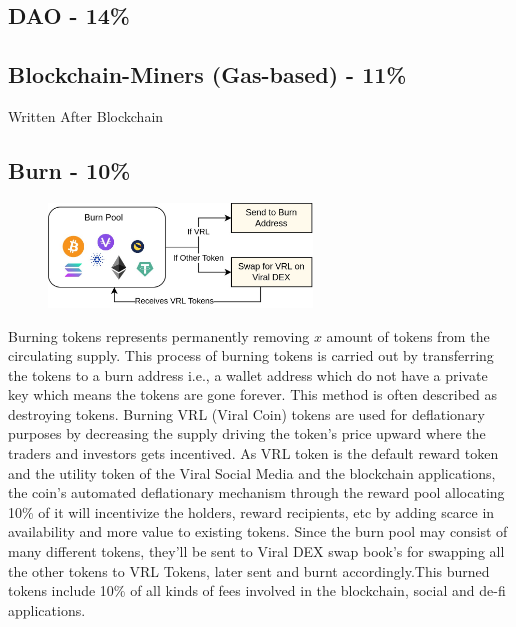 \documentclass[conference]{IEEEtran}
\begin{document}
\subsection{\textbf{DAO - 14\%}}


\subsection{\textbf{Blockchain-Miners (Gas-based) - 11\%}}

Written After Blockchain\\

\subsection{\textbf{Burn - 10\%}}
\begin{figure}[H]
\begin{center}
\includegraphics[width=7cm]{burnpool}
\end{center}
\end{figure}

Burning tokens represents permanently removing $x$ amount of tokens from the circulating supply. This process of burning tokens is carried out by transferring the tokens to a burn address i.e., a wallet address which do not have a private key which means the tokens are gone forever. This method is often described as destroying tokens.  Burning VRL (Viral Coin) tokens are used for deflationary purposes by decreasing the supply driving the token's price upward where the traders and investors gets incentived. As VRL token is the default reward token and the utility token of the Viral Social Media and the blockchain applications, the coin's automated deflationary mechanism through the reward pool allocating 10\% of it will incentivize the holders, reward recipients, etc by adding scarce in availability and more value to existing tokens. Since the burn pool may consist of many different tokens, they'll be sent to Viral DEX swap book's for swapping all the other tokens to VRL Tokens, later sent and burnt accordingly.This burned tokens include 10\% of all kinds of fees involved in the blockchain, social and de-fi applications.\\
\end{document}
